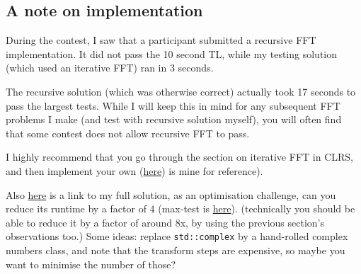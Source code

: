 	\subsection{A note on implementation}
		During the contest, I saw that a participant submitted a recursive FFT implementation.
		It did not pass the 10 second TL, while my testing solution (which used an iterative FFT)
		ran in 3 seconds.

		The recursive solution (which was otherwise correct) actually took 17 seconds to pass the
		largest tests. While I will keep this in mind for any subsequent FFT problems I make
		(and test with recursive solution myself), you will often find that some contest does not
		allow recursive FFT to pass.

		I highly recommend that you go through the section on iterative FFT in CLRS, and then implement
		your own (\href{https://github.com/parthmittal/codebook/blob/master/fastfft.cpp}{here}) is mine
		for reference).

		Also \href{https://pastebin.com/Jf7H8Prp}{here} is a link to my full solution, as an optimisation challenge,
		can you reduce its runtime by a factor of $4$ (max-test is
		\href{https://drive.google.com/file/d/0B-W-TWxgtybGQzhvR0hGZUM2MU0/view?usp=sharing}{here}).
		(technically you should be able to reduce it by a factor of around 8x, by using the previous section's observations too.)
		Some ideas: replace \verb|std::complex| by a hand-rolled complex numbers class, and note that the transform
		steps are expensive, so maybe you want to minimise the number of those?

